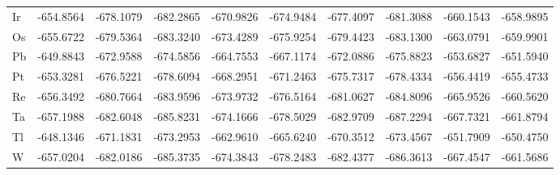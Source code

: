 \begin{table}[htbp]
{\begin{tabular}{l *{9}{l}}
        Ir	& -654.8564	&-678.1079	&-682.2865	&-670.9826	&-674.9484	&-677.4097	&-681.3088	&-660.1543	&-658.9895 \\
        Os	& -655.6722	&-679.5364	&-683.3240  &-673.4289	&-675.9254	&-679.4423	&-683.1300	&-663.0791	&-659.9901 \\
        Pb	& -649.8843	&-672.9588	&-674.5856	&-664.7553	&-667.1174	&-672.0886	&-675.8823	&-653.6827	&-651.5940 \\
        Pt	& -653.3281	&-676.5221	&-678.6094	&-668.2951	&-671.2463	&-675.7317	&-678.4334	&-656.4419	&-655.4733 \\
        Re	& -656.3492	&-680.7664	&-683.9596	&-673.9732	&-676.5164	&-681.0627	&-684.8096	&-665.9526	&-660.5620 \\
        Ta	& -657.1988	&-682.6048	&-685.8231	&-674.1666	&-678.5029	&-682.9709	&-687.2294	&-667.7321	&-661.8794 \\
        Tl	& -648.1346	&-671.1831	&-673.2953	&-662.9610  &-665.6240  &-670.3512	&-673.4567	&-651.7909	&-650.4750 \\
        W	  & -657.0204	&-682.0186	&-685.3735	&-674.3843	&-678.2483	&-682.4377	&-686.3613	&-667.4547	&-661.5686 \\
        \bottomrule
      \end{tabular}
    }
\end{table}

